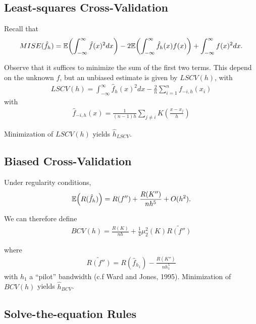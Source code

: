 \subsection{Least-squares Cross-Validation}
\label{sec:least-squares-cross}

Recall that
\begin{equation}
  \label{eq:30}
  MISE(\hat f_{h}) = \E{\int_{-\infty}^{\infty} \hat f(x)^{2} dx} - 2
  \E{\int_{-\infty}^{\infty} \hat f_{h}(x) f(x)} +
  \int_{-\infty}^{\infty} f(x)^{2} dx.
\end{equation}

Observe that it suffices to minimize the sum of the first two terms.
This depend on the unknown $f$, but an unbiased estimate is given by
$LSCV(h)$, with
\begin{align}
  \label{eq:31}
  LSCV(h) = \int_{-\infty}^{\infty} \hat f_{h}(x)^{2} dx - \frac{2}{n}
  \sum_{i=1}^{n} f_{-i, h}(x_{i})
\end{align} with
\begin{align}
  \label{eq:32}
  \hat f_{-i, h}(x) = \frac{1}{(n-1)h} \sum_{j \neq i} K(\frac{x - x_{j}}{h})
\end{align}

Minimization of $LSCV(h)$ yields $\hat h_{LSCV}$.

\subsection{Biased Cross-Validation}
\label{sec:bias-cross-valid}

Under regularity conditions,
\begin{align}
  \label{eq:34}
  \E{R(\hat f_{h})} = R(f'') + \frac{R(K'')}{n h^{5}} + O(h^{2}).
\end{align}

We can therefore define
\begin{align}
  \label{eq:36}
  BCV(h) = \frac{R(K)}{nh} + \frac{1}{4} \mu_{2}^{2}(K) \widetilde{R(f'')}
\end{align}

where
\begin{align}
  \label{eq:35}
  \widetilde{R(f'')} = R(\hat f_{h_{1}}) - \frac{R(K'')}{nh_{1}^{5}}
\end{align} with $h_{1}$ a ``pilot'' bandwidth (c.f Ward and Jones,
1995).  Minimization of $BCV(h)$ yields $\hat h_{BCV}$.

\subsection{Solve-the-equation Rules}
\label{sec:solve-equation-rules}


